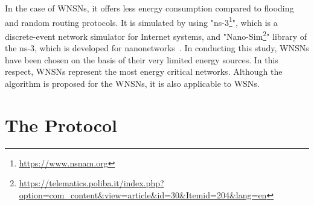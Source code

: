 \documentclass[12pt, oneandhalf, chaparabic, sees, ms]{metu}
\begin{document}
In the case of WNSNs, it offers less energy consumption compared to flooding and random routing protocols. 
It is simulated by using "ns-3\footnote{\url{https://www.nsnam.org}}", which is a discrete-event network simulator for Internet systems, 
and "Nano-Sim\footnote{\url{https://telematics.poliba.it/index.php?option=com_content&view=article&id=30&Itemid=204&lang=en}}" library of the ns-3, which is developed for
nanonetworks~\cite{piroNS32013, piroPA2013}.
In conducting this study, WNSNs have been chosen on the basis of their very limited energy sources. In this respect, WNSNs 
represent the most energy critical networks. Although the algorithm is proposed for the WNSNs, it is also applicable to WSNs.





\newpage
\section{The Protocol}\label{sprot}
\end{document}
